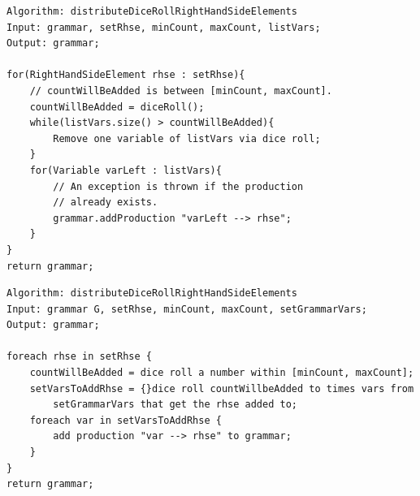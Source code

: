  
\pagebreak
 
\lstset{language=java}
\begin{lstlisting}[frame=htrbl, caption={distributeDiceRollRightHandSideElements}, 
label={lst:distributeDiceRollRightHandSideElements}]
Algorithm: distributeDiceRollRightHandSideElements
Input: grammar, setRhse, minCount, maxCount, listVars;
Output: grammar;

for(RightHandSideElement rhse : setRhse){
	// countWillBeAdded is between [minCount, maxCount]. 
	countWillBeAdded = diceRoll();
	while(listVars.size() > countWillBeAdded){
		Remove one variable of listVars via dice roll;
	}
	for(Variable varLeft : listVars){
		// An exception is thrown if the production 
		// already exists.
		grammar.addProduction "varLeft --> rhse";
	}
}
return grammar;
\end{lstlisting}


\lstset{}
\begin{lstlisting}[frame=htrbl, caption={distributeDiceRollRightHandSideElementsShort}, 
label={lst:distributeDiceRollRightHandSideElementsShort}]
Algorithm: distributeDiceRollRightHandSideElements
Input: grammar G, setRhse, minCount, maxCount, setGrammarVars;
Output: grammar;

foreach rhse in setRhse { 
	countWillBeAdded = dice roll a number within [minCount, maxCount];
	setVarsToAddRhse = {}dice roll countWillbeAdded to times vars from 	
		setGrammarVars that get the rhse added to;
	foreach var in setVarsToAddRhse {
		add production "var --> rhse" to grammar;
	}
}
return grammar;
\end{lstlisting}

